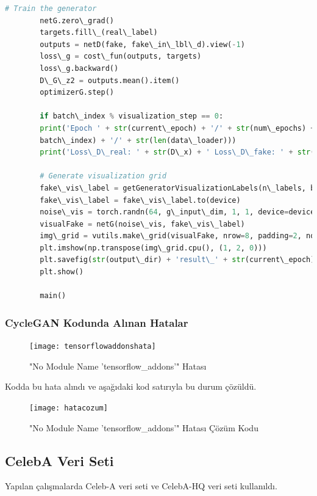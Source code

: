 \documentclass[12pt, a4paper]{article}
\begin{document}
\begin{lstlisting}[language=Python, breaklines=true, breakatwhitespace=true, basicstyle=\ttfamily, columns=fullflexible]
		# Train the generator
		netG.zero\_grad()
		targets.fill\_(real\_label)
		outputs = netD(fake, fake\_in\_lbl\_d).view(-1)
		loss\_g = cost\_fun(outputs, targets)
		loss\_g.backward()
		D\_G\_z2 = outputs.mean().item()
		optimizerG.step()
		
		if batch\_index % visualization_step == 0:
		print('Epoch ' + str(current\_epoch) + '/' + str(num\_epochs) + ' batch ' + str(
		batch\_index) + '/' + str(len(data\_loader)))
		print('Loss\_D\_real: ' + str(D\_x) + ' Loss\_D\_fake: ' + str(D\_G\_z1) + ' Loss G: ' + str(D\_G\_z2))
		
		# Generate visualization grid
		fake\_vis\_label = getGeneratorVisualizationLabels(n\_labels, batch\_size)
		fake\_vis\_label = fake\_vis\_label.to(device)
		noise\_vis = torch.randn(64, g\_input\_dim, 1, 1, device=device)  # 64 samples for a 8x8 grid
		visualFake = netG(noise\_vis, fake\_vis\_label)
		img\_grid = vutils.make\_grid(visualFake, nrow=8, padding=2, normalize=True)
		plt.imshow(np.transpose(img\_grid.cpu(), (1, 2, 0)))
		plt.savefig(str(output\_dir) + 'result\_' + str(current\_epoch) + '\_' + str(batch\_index) + '.png')
		plt.show()
		
		main()
	\end{lstlisting}
	
	\clearpage
	\subsubsection{CycleGAN Kodunda Alınan Hatalar}
	\begin{figure}[h]
		\centering
		\texttt{[image: tensorflowaddonshata]}
		\label{tensorflowaddonshata}
		\caption{"No Module Name 'tensorflow\_addons'" Hatası\cite{a-2024-05-22}}
	\end{figure}
	\FloatBarrier
	Kodda bu hata alındı ve aşağıdaki kod satırıyla bu durum çözüldü.
	
	\begin{figure}[h]
		\centering
		\texttt{[image: hatacozum]}
		\label{hatacozum}
		\caption{"No Module Name 'tensorflow\_addons'" Hatası Çözüm Kodu\cite{How-2024-05-22}}
	\end{figure}
	\FloatBarrier
	\subsection{CelebA Veri Seti}
	Yapılan çalışmalarda Celeb-A veri seti ve CelebA-HQ veri seti kullanıldı.
\end{document}
